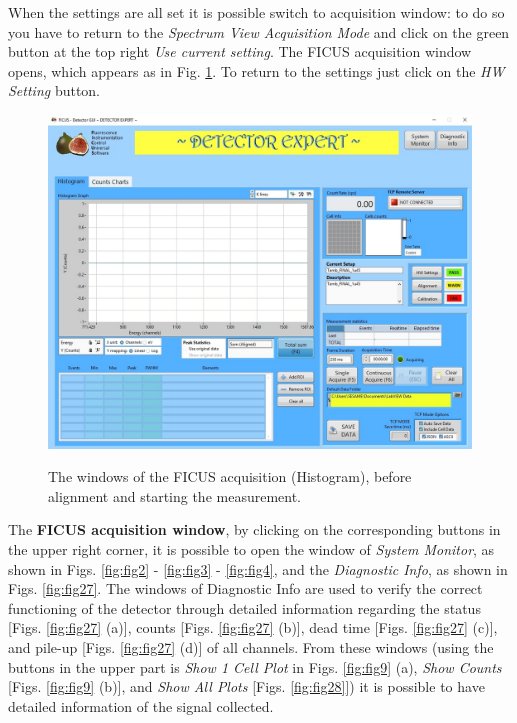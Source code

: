 \documentclass[a4paper,12pt,oneside,pdflatex,italian,final,twocolumn]{article}
\begin{document}
When the settings are all set it is possible switch to acquisition window: to do so you have to return to the \textit{Spectrum View Acquisition Mode} and click on the green button at the top right \textit{Use current setting}.
The FICUS acquisition window opens, which appears as in Fig. \ref{fig:fig18}. To return to the settings just click on the \textit{HW Setting} button.

\clearpage

\begin{figure}[h]
\centering
{\includegraphics[width=.9\textwidth]{Capture33.jpg}} \quad
\caption{The windows of the FICUS acquisition (Histogram), before alignment and starting the measurement.}\label{fig:fig18}
\end{figure}

The \textbf{FICUS acquisition window}, by clicking on the corresponding buttons in the upper right corner, it is possible to open the window of \textit{System Monitor}, as shown in Figs. \ref{fig:fig2} - \ref{fig:fig3} - \ref{fig:fig4}, and the \textit{Diagnostic Info}, as shown in Figs. \ref{fig:fig27}. The windows of Diagnostic Info are used to verify the correct functioning of the detector through detailed information regarding the status [Figs. \ref{fig:fig27} (a)], counts [Figs. \ref{fig:fig27} (b)], dead time [Figs. \ref{fig:fig27} (c)], and pile-up [Figs. \ref{fig:fig27} (d)] of all channels. From these windows (using the buttons in the upper part is \textit{Show 1 Cell Plot} in Figs. \ref{fig:fig9} (a), \textit{Show Counts} [Figs. \ref{fig:fig9} (b)], and \textit{Show All Plots} [Figs. \ref{fig:fig28}]) it is possible to have detailed information of the signal collected.
\end{document}

